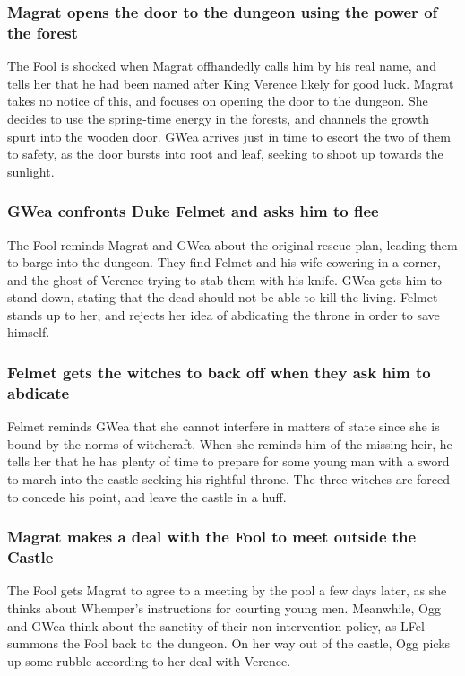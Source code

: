 \subsubsection{\Gls{Magrat} opens the door to the dungeon using the power of the forest}
The \Gls{Fool} is shocked when \Gls{Magrat} offhandedly calls him by his real name, and tells her
that he had been named after King \Gls{Verence} likely for good luck. \Gls{Magrat} takes no notice
of this, and focuses on opening the door to the dungeon. She decides to use the spring-time energy
in the forests, and channels the growth spurt into the wooden door. \Gls{GWea} arrives just in time
to escort the two of them to safety, as the door bursts into root and leaf, seeking to shoot up
towards the sunlight.

\subsubsection{\Gls{GWea} confronts Duke \Gls{Felmet} and asks him to flee}
The \Gls{Fool} reminds \Gls{Magrat} and \Gls{GWea} about the original rescue plan, leading them to
barge into the dungeon. They find \Gls{Felmet} and his wife cowering in a corner, and the ghost of
\Gls{Verence} trying to stab them with his knife. \Gls{GWea} gets him to stand down, stating that
the dead should not be able to kill the living. \Gls{Felmet} stands up to her, and rejects her idea
of abdicating the throne in order to save himself.

\subsubsection{\Gls{Felmet} gets the witches to back off when they ask him to abdicate}
\Gls{Felmet} reminds \Gls{GWea} that she cannot interfere in matters of state since she is bound by
the norms of witchcraft. When she reminds him of the missing heir, he tells her that he has plenty
of time to prepare for some young man with a sword to march into the castle seeking his rightful
throne. The three witches are forced to concede his point, and leave the castle in a huff.

\subsubsection{\Gls{Magrat} makes a deal with the \Gls{Fool} to meet outside the Castle}
The \Gls{Fool} gets \Gls{Magrat} to agree to a meeting by the pool a few days later, as she thinks
about \Gls{Whemper}'s instructions for courting young men. Meanwhile, \Gls{Ogg} and \Gls{GWea} think
about the sanctity of their non-intervention policy, as \Gls{LFel} summons the \Gls{Fool} back to
the dungeon. On her way out of the castle, \Gls{Ogg} picks up some rubble according to her deal with
\Gls{Verence}.

